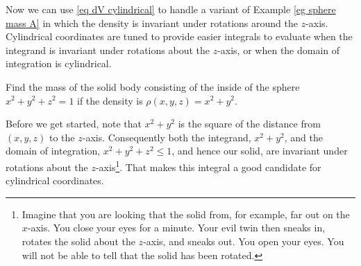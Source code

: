 Now we can use \eqref{eq dV cylindrical} to handle a variant of 
Example \ref{eg sphere mass A}
in which the density is invariant under rotations around the $z$-axis.
Cylindrical coordinates are tuned to provide easier integrals to 
evaluate when the integrand is invariant under rotations about the $z$-axis,
or when the domain of integration is cylindrical.


\begin{eg}\label{eg sphere mass B}
Find the mass of the solid body consisting of the inside of the sphere $x^2+y^2+z^2=1$ if the density is $\rho(x,y,z) = x^2+y^2$.

\soln
Before we get started, note that $x^2+y^2$ is the square of the distance from $(x,y,z)$ to the $z$-axis. Consequently both the integrand, $x^2+y^2$, 
and the domain of integration, $x^2+y^2+z^2\le 1$, and hence our solid, are invariant under rotations about the $z$-axis\footnote{Imagine that you are looking that the solid from, for example, far out on the $x$-axis. You close your eyes for a minute. Your evil twin then sneaks in, rotates the solid about the $z$-axis, and sneaks out. You open your eyes. You will not be able to tell that the solid has been rotated.}. That makes this
integral a good candidate for cylindrical coordinates.


\end{eg}
